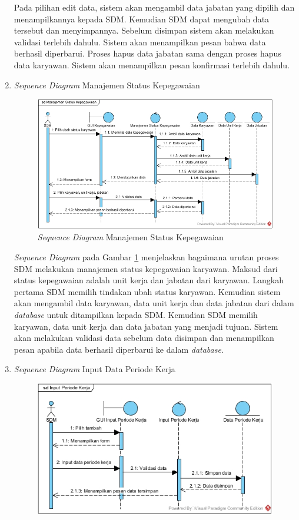 \begin{enumerate}
            		Pada pilihan edit data, sistem akan mengambil data jabatan yang dipilih dan menampilkannya kepada SDM. Kemudian SDM dapat mengubah data tersebut dan menyimpannya. Sebelum disimpan sistem akan melakukan validasi terlebih dahulu. Sistem akan menampilkan pesan bahwa data berhasil diperbarui. Proses hapus data jabatan sama dengan proses hapus data karyawan. Sistem akan menampilkan pesan konfirmasi terlebih dahulu.
            	\item \emph{Sequence Diagram} Manajemen Status Kepegawaian
			        \begin{figure}[H]
            		    \centering            		    \includegraphics[width=14cm]{gambar/sequence/manajemen-status-kepegawaian}
            		    \caption{\emph{Sequence Diagram} Manajemen Status Kepegawaian}
            		    \label{sequence_manajemen_kepegawaian}
            		\end{figure}
            		\emph{Sequence Diagram} pada Gambar \ref{sequence_manajemen_kepegawaian} menjelaskan bagaimana urutan proses SDM melakukan manajemen status kepegawaian karyawan. Maksud dari status kepegawaian adalah unit kerja dan jabatan dari karyawan. Langkah pertama SDM memilih tindakan ubah status karyawan. Kemudian sistem akan mengambil data karyawan, data unit kerja dan data jabatan dari dalam \emph{database} untuk ditampilkan kepada SDM. Kemudian SDM memilih karyawan, data unit kerja dan data jabatan yang menjadi tujuan. Sistem akan melakukan validasi data sebelum data disimpan dan menampilkan pesan apabila data berhasil diperbarui ke dalam \emph{database}.
            	\item \emph{Sequence Diagram} Input Data Periode Kerja
			        \begin{figure}[H]
            		    \centering
            		    \includegraphics[width=13cm]{gambar/sequence/input-periode-kerja}

\end{figure}
\end{enumerate}
